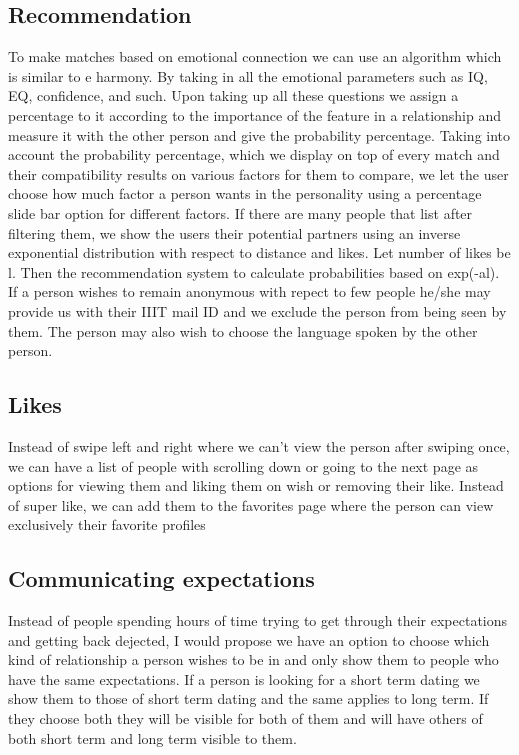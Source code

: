 \documentclass[conference]{IEEEtran}
\begin{document}
\subsection{Recommendation}
To make matches based on emotional connection we can use an algorithm which is similar to e harmony. By taking in all the emotional parameters such as IQ, EQ, confidence, and such. Upon taking up all these questions we assign a percentage to it according to the importance of the feature in a relationship and measure it with the other person and give the probability percentage. Taking into account the probability percentage, which we display on top of every match and their compatibility results on various factors for them to compare, we let the user choose how much factor a person wants in the personality using a percentage slide bar option for different factors. If there are many people that list after filtering them, we show the users their potential partners using an inverse exponential distribution with respect to distance and likes. Let number of likes be l. Then the recommendation system to calculate probabilities based on exp(-al). If a person wishes to remain anonymous with repect to few people he/she may provide us with their IIIT mail ID and we exclude the person from being seen by them. The person may also wish to choose the language spoken by the other person.

\subsection{Likes}
Instead of swipe left and right where we can't view the person after swiping once, we can have a list of people with scrolling down or going to the next page as options for viewing them and liking them on wish or removing their like. Instead of super like, we can add them to the favorites page where the person can view exclusively their favorite profiles 

\subsection{Communicating expectations}
Instead of people spending hours of time trying to get through their expectations and getting back dejected, I would propose we have an option to choose which kind of relationship a person wishes to be in and only show them to people who have the same expectations. If a person is looking for a short term dating we show them to those of short term dating and the same applies to long term. If they choose both they will be visible for both of them and will have others of both short term and long term visible to them.
\end{document}
